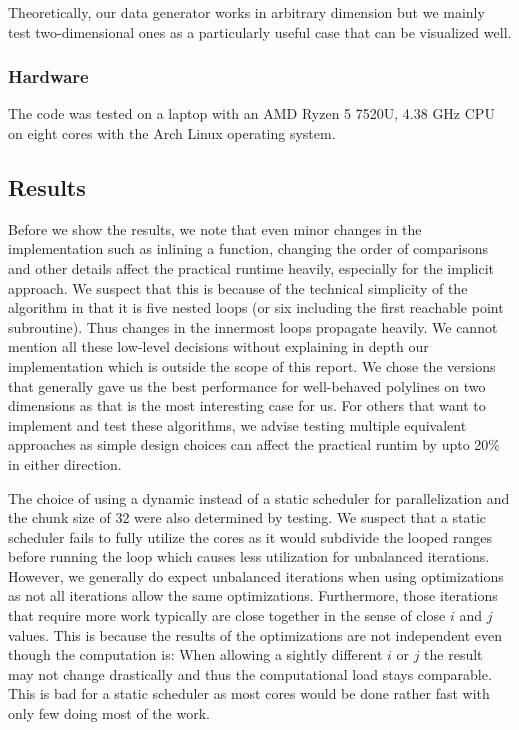 Theoretically, our data generator works in arbitrary dimension but we mainly test two-dimensional ones as a particularly useful case that can be visualized well. 

\subsubsection{Hardware}
\label{subsubsec:hardware}
The code was tested on a laptop with an AMD Ryzen 5 7520U, 4.38 GHz CPU on eight cores with the Arch Linux operating system.


\subsection{Results}
\label{subsec:results}
Before we show the results, we note that even minor changes in the implementation such as inlining a function, changing the order of comparisons and other details affect the practical runtime heavily, especially for the implicit approach. We suspect that this is because of the technical simplicity of the algorithm in that it is five nested loops (or six including the first reachable point subroutine). Thus changes in the innermost loops propagate heavily. We cannot mention all these low-level decisions without explaining in depth our implementation which is outside the scope of this report. We chose the versions that generally gave us the best performance for well-behaved polylines on two dimensions as that is the most interesting case for us. For others that want to implement and test these algorithms, we advise testing multiple equivalent approaches as simple design choices can affect the practical runtim by upto 20\% in either direction. 

The choice of using a dynamic instead of a static scheduler for parallelization and the chunk size of \(32\) were also determined by testing. We suspect that a static scheduler fails to fully utilize the cores as it would subdivide the looped ranges before running the loop which causes less utilization for unbalanced iterations. However, we generally do expect unbalanced iterations when using optimizations as not all iterations allow the same optimizations. Furthermore, those iterations that require more work typically are close together in the sense of close \(i\) and \(j\) values. This is because the results of the optimizations are not independent even though the computation is: When allowing a sightly different \(i\) or \(j\) the result may not change drastically and thus the computational load stays comparable. This is bad for a static scheduler as most cores would be done rather fast with only few doing most of the work. 


